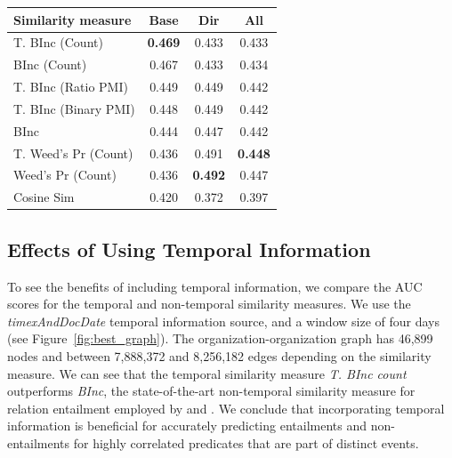 \documentclass[11pt]{article}
\begin{document}
\begin{table}
\centering
\begin{tabular}{lccc}
    \toprule
    \textbf{Similarity measure}          & \textbf{Base}    & \textbf{Dir} & \textbf{All}     \\
    \midrule
    T. BInc (Count)             & \textbf{0.469} & 0.433                & 0.433          \\ 
    BInc (Count)                & 0.467          & 0.433                & 0.434          \\ 
    T. BInc (Ratio PMI)         & 0.449          & 0.449                & 0.442          \\ 
    T. BInc (Binary PMI)        & 0.448          & 0.449                & 0.442          \\ 
    BInc                        & 0.444          & 0.447                & 0.442          \\ 
    T. Weed's Pr (Count)         & 0.436          & 0.491                & \textbf{0.448} \\ 
    Weed's Pr (Count)            & 0.436          & \textbf{0.492}       & 0.447          \\ 
    Cosine Sim                  & 0.420          & 0.372                & 0.397          \\
    \bottomrule
    \end{tabular}
    \label{tab:subsets}
\end{table}

\subsection{Effects of Using Temporal Information}
\label{sec:results_best}
To see the benefits of including temporal information, we compare the AUC scores for the temporal and non-temporal similarity measures. We use the \textit{timexAndDocDate} temporal information source, and a window size of four days (see Figure~\ref{fig:best_graph}). The organization-organization graph has 46,899 nodes and between 7,888,372 and 8,256,182 edges depending on the similarity measure. We can see that the temporal similarity measure \textit{T. BInc count} outperforms \textit{BInc}, the state-of-the-art non-temporal similarity measure for relation entailment employed by  and . We conclude that incorporating temporal information is beneficial for accurately predicting entailments and non-entailments for highly correlated predicates that are part of distinct events.
\end{document}
